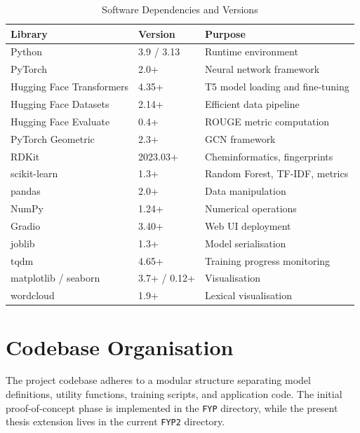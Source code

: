 \documentclass[12pt,a4paper,oneside]{report}
\begin{document}
\begin{table}[htbp]
\centering
\caption{Software Dependencies and Versions}
\label{tab:software}
\begin{tabular}{lll}
\toprule
\textbf{Library} & \textbf{Version} & \textbf{Purpose} \\
\midrule
Python                     & 3.9 / 3.13 & Runtime environment \\
PyTorch                    & 2.0+       & Neural network framework \\
Hugging Face Transformers  & 4.35+      & T5 model loading and fine-tuning \\
Hugging Face Datasets      & 2.14+      & Efficient data pipeline \\
Hugging Face Evaluate      & 0.4+       & ROUGE metric computation \\
PyTorch Geometric          & 2.3+       & GCN framework \\
RDKit                      & 2023.03+   & Cheminformatics, fingerprints \\
scikit-learn               & 1.3+       & Random Forest, TF-IDF, metrics \\
pandas                     & 2.0+       & Data manipulation \\
NumPy                      & 1.24+      & Numerical operations \\
Gradio                     & 3.40+      & Web UI deployment \\
joblib                     & 1.3+       & Model serialisation \\
tqdm                       & 4.65+      & Training progress monitoring \\
matplotlib / seaborn       & 3.7+ / 0.12+ & Visualisation \\
wordcloud                  & 1.9+       & Lexical visualisation \\
\bottomrule
\end{tabular}
\end{table}

\section{Codebase Organisation}

The project codebase adheres to a modular structure separating model definitions, utility
functions, training scripts, and application code. The initial proof-of-concept phase is
implemented in the \texttt{FYP} directory, while the present thesis extension lives in the
current \texttt{FYP2} directory.
\end{document}
